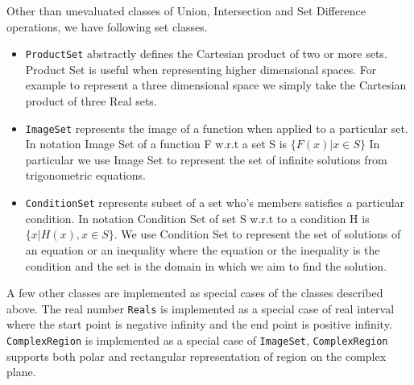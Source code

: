 
Other than unevaluated classes of Union, Intersection and Set Difference
operations, we have following set classes.

\begin{itemize}

    \item \verb|ProductSet| abstractly defines the Cartesian product of two
        or more sets. Product Set is useful when representing higher
        dimensional spaces. For example to represent a three dimensional space
        we simply take the Cartesian product of three Real sets.

    \item \verb|ImageSet| represents the image of a function when applied to
        a particular set. In notation Image Set of a function F w.r.t a set S
        is $\{ F(x) | x \in S \}$ In particular we use Image Set to represent the
        set of infinite solutions from trigonometric equations.


    \item \verb|ConditionSet| represents subset of a set who's members
        satisfies a particular condition. In notation Condition Set of set S
        w.r.t to a condition H is $\{x | H(x), x \in S \}$. We use Condition Set
        to represent the set of solutions of an equation or an inequality where
        the equation or the inequality is the condition and the set is the
        domain in which we aim to find the solution.


\end{itemize}

A few other classes are implemented as special cases of the classes described
above. The real number \verb|Reals| is implemented as a special case of real
interval where the start point is negative infinity and the end point is
positive infinity. \verb|ComplexRegion| is implemented as a special case of
\verb|ImageSet|, \verb|ComplexRegion| supports both polar and rectangular
representation of region on the complex plane.
